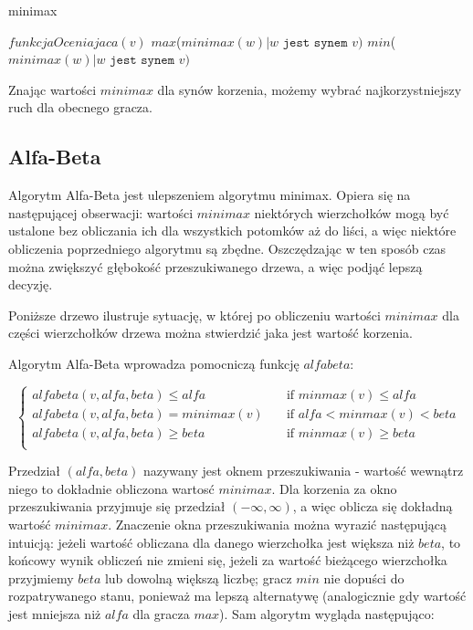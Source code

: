 \documentclass{pracamgr}
\begin{document}
\begin{algorithm}
\caption{minimax}\label{minimax}
\begin{algorithmic}[1]
	\State \Return $funkcjaOceniajaca(v)$
\EndIf
{}
    \State \Return $max$($minimax(w) | \texttt{\(w\) jest synem \(v\)})$
\Else
    \State \Return $min$($minimax(w) | \texttt{\(w\) jest synem \(v\)})$
\EndIf
\EndFunction
\end{algorithmic}
\end{algorithm}

Znając wartości \(minimax\) dla synów korzenia, możemy wybrać najkorzystniejszy ruch dla obecnego gracza.

\subsection{Alfa-Beta}

Algorytm Alfa-Beta jest ulepszeniem algorytmu minimax. Opiera się na następującej obserwacji: wartości \(minimax\) niektórych wierzchołków mogą być ustalone bez obliczania ich dla wszystkich potomków aż do liści, a więc niektóre obliczenia poprzedniego algorytmu są zbędne. Oszczędzając w ten sposób czas można zwiększyć głębokość przeszukiwanego drzewa, a więc podjąć lepszą decyzję.

Poniższe drzewo ilustruje sytuację, w której po obliczeniu wartości \(minimax\) dla części wierzchołków drzewa można stwierdzić jaka jest wartość korzenia.

\begin{center}\end{center}

Algorytm Alfa-Beta wprowadza pomocniczą funkcję \(alfabeta\):

\[
  \begin{cases}
    alfabeta(v, alfa, beta) \leq alfa    & \quad \text{if } minmax(v) \leq alfa\\
    alfabeta(v, alfa, beta) = minimax(v) & \quad \text{if } alfa < minmax(v) < beta \\
    alfabeta(v, alfa, beta) \geq beta    & \quad \text{if } minmax(v) \geq beta \\
  \end{cases}
\]

Przedział \((alfa, beta)\) nazywany jest oknem przeszukiwania - wartość wewnątrz niego to dokładnie obliczona wartosć \(minimax\).
Dla korzenia za okno przeszukiwania przyjmuje się przedział \((-\infty, \infty)\), a więc oblicza się dokładną wartość \(minimax\).
Znaczenie okna przeszukiwania można wyrazić następującą intuicją: jeżeli wartość obliczana dla danego wierzchołka jest większa niż \(beta\), to końcowy wynik obliczeń nie zmieni się, jeżeli za wartość bieżącego wierzchołka przyjmiemy \(beta\) lub dowolną większą liczbę; gracz \(min\) nie dopuści do rozpatrywanego stanu, ponieważ ma lepszą alternatywę (analogicznie gdy wartość jest mniejsza niż \(alfa\) dla gracza \(max\)).
Sam algorytm wygląda następująco:
\end{document}
